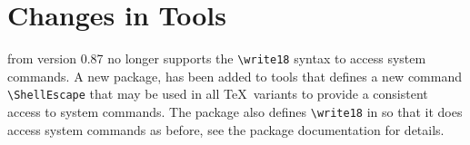 \documentclass{ltnews}
\begin{document}
\section{Changes in Tools}

 from version 0.87 no longer supports the
\verb|\write18| syntax to access system commands. A new package,
 has been added to \textsf{tools} that defines a new
command \verb|\ShellEscape| that may be used in all \TeX\ variants to
provide a consistent access to system commands. The package also
defines \verb|\write18| in   so that it does access
system commands as before, see the package documentation for details.
\end{document}
